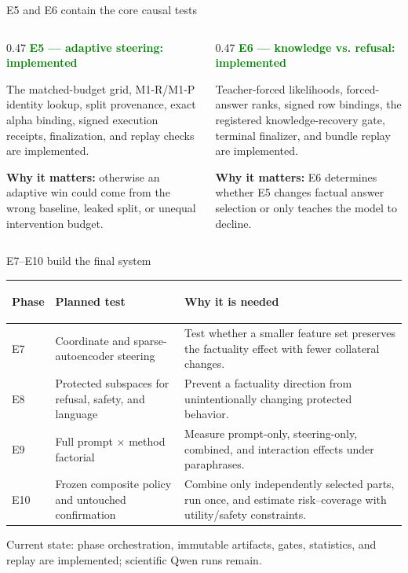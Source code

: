 \documentclass[aspectratio=169,11pt]{beamer}
\begin{document}
\begin{frame}{E5 and E6 contain the core causal tests}
  \small
  \begin{columns}[T,onlytextwidth]
    \begin{column}{0.47\textwidth}
      \textcolor{Green}{\bfseries E5 --- adaptive steering: implemented}\par\vspace{0.15cm}
      The matched-budget grid, M1-R/M1-P identity lookup, split provenance, exact alpha binding, signed execution receipts, finalization, and replay checks are implemented.\par\vspace{0.3cm}
      \textbf{Why it matters:} otherwise an adaptive win could come from the wrong baseline, leaked split, or unequal intervention budget.
    \end{column}
    \begin{column}{0.47\textwidth}
      \textcolor{Green}{\bfseries E6 --- knowledge vs. refusal: implemented}\par\vspace{0.15cm}
      Teacher-forced likelihoods, forced-answer ranks, signed row bindings, the registered knowledge-recovery gate, terminal finalizer, and bundle replay are implemented.\par\vspace{0.3cm}
      \textbf{Why it matters:} E6 determines whether E5 changes factual answer selection or only teaches the model to decline.
    \end{column}
  \end{columns}
\end{frame}

\begin{frame}{E7--E10 build the final system}
  \footnotesize
  \renewcommand{\arraystretch}{1.10}
  \begin{tabular}{@{}>{\bfseries\raggedright\arraybackslash}p{} >{\raggedright\arraybackslash}p{} >{\raggedright\arraybackslash}p{}@{}}
    \toprule
    Phase & Planned test & Why it is needed \\
    \midrule
    E7 & Coordinate and sparse-autoencoder steering & Test whether a smaller feature set preserves the factuality effect with fewer collateral changes. \\
    E8 & Protected subspaces for refusal, safety, and language & Prevent a factuality direction from unintentionally changing protected behavior. \\
    E9 & Full prompt $\times$ method factorial & Measure prompt-only, steering-only, combined, and interaction effects under paraphrases. \\
    E10 & Frozen composite policy and untouched confirmation & Combine only independently selected parts, run once, and estimate risk--coverage with utility/safety constraints. \\
    \bottomrule
  \end{tabular}
  \vspace{0.12cm}
  {\scriptsize\color{Muted}Current state: phase orchestration, immutable artifacts, gates, statistics, and replay are implemented; scientific Qwen runs remain.}
\end{frame}
\end{document}
